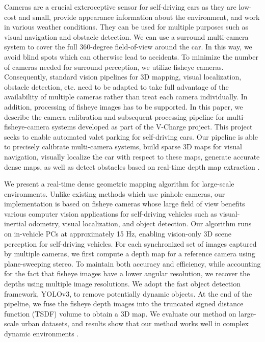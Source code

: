 Cameras are a crucial exteroceptive sensor for self-driving cars as they are low-cost and small, provide appearance information about the environment, and work in various weather conditions. They can be used for multiple purposes such as visual navigation and obstacle detection. We can use a surround multi-camera system to cover the full 360-degree field-of-view around the car. In this way, we avoid blind spots which can otherwise lead to accidents. To minimize the number of cameras needed for surround perception, we utilize fisheye cameras. Consequently, standard vision pipelines for 3D mapping, visual localization, obstacle detection, etc. need to be adapted to take full advantage of the availability of multiple cameras rather than treat each camera individually. In addition, processing of fisheye images has to be supported. In this paper, we describe the camera calibration and subsequent processing pipeline for multi-fisheye-camera systems developed as part of the V-Charge project. This project seeks to enable automated valet parking for self-driving cars. Our pipeline is able to precisely calibrate multi-camera systems, build sparse 3D maps for visual navigation, visually localize the car with respect to these maps, generate accurate dense maps, as well as detect obstacles based on real-time depth map extraction \cite{Hane2017}.

We present a real-time dense geometric mapping algorithm for large-scale environments. Unlike existing methods which use pinhole cameras, our implementation is based on fisheye cameras whose large field of view benefits various computer vision applications for self-driving vehicles such as visual-inertial odometry, visual localization, and object detection. Our algorithm runs on in-vehicle PCs at approximately 15 Hz, enabling vision-only 3D scene perception for self-driving vehicles. For each synchronized set of images captured by multiple cameras, we first compute a depth map for a reference camera using plane-sweeping stereo. To maintain both accuracy and efficiency, while accounting for the fact that fisheye images have a lower angular resolution, we recover the depths using multiple image resolutions. We adopt the fast object detection framework, YOLOv3, to remove potentially dynamic objects. At the end of the pipeline, we fuse the fisheye depth images into the truncated signed distance function (TSDF) volume to obtain a 3D map. We evaluate our method on large-scale urban datasets, and results show that our method works well in complex dynamic environments \cite{Cui2019}.

